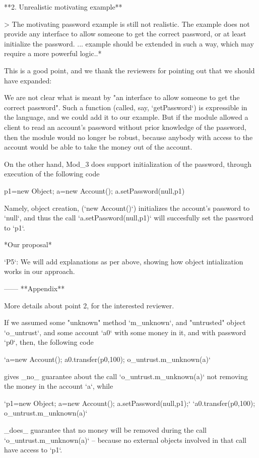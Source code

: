 **2. Unrealistic motivating example**

> The motivating password example is still not realistic. The example does not 
provide any interface to allow someone to get the correct password, or at 
least initialize the password. ... example should be extended in such a way, 
which may require a more powerful logic..*

This is a good point, and we thank the reviewers for pointing out that we should
have expanded:

We are not clear what is meant by "an interface to allow someone to get the 
correct password". Such a function (called, say, `getPassword`) is expressible
in the language, and we could add it to our example. But if the module allowed 
a client to read an account's password without prior knowledge of the password, 
then the module would no longer be robust, because anybody with access to
the account would be able to take the money out of the account. 

On the other hand, Mod_3 does support initialization of the password, through
execution of the following code

	p1=new Object; a=new Account(); a.setPassword(null,p1)

Namely, object creation, (`new Account()`) initializes the account's password
to `null`, and thus the call `a.setPassword(null,p1)` will succesfully set the password
to `p1`. 

*Our proposal* 

`P5`: We will add explanations as per above, showing how object intialization works 
in our approach. 

------
**Appendix**

More details about point 2, for the interested reviewer.

If we assumed some "unknown" method `m_unknown`, and "untrusted" 
object `o_untrust`, and some account `a0` with some money in it, and with password
`p0`, then, the following code

         `a=new Account(); a0.transfer(p0,100); o_untrust.m_unknown(a)`

gives _no_ guarantee about the call `o_untrust.m_unknown(a)` not removing the money in the account `a`, while

        `p1=new Object; a=new Account();  a.setPassword(null,p1);`
        `a0.transfer(p0,100);  o_untrust.m_unknown(a)`

_does_ guarantee that no money will be removed during the call `o_untrust.m_unknown(a)`
-- because no external objects involved in that call have access to `p1`.  


